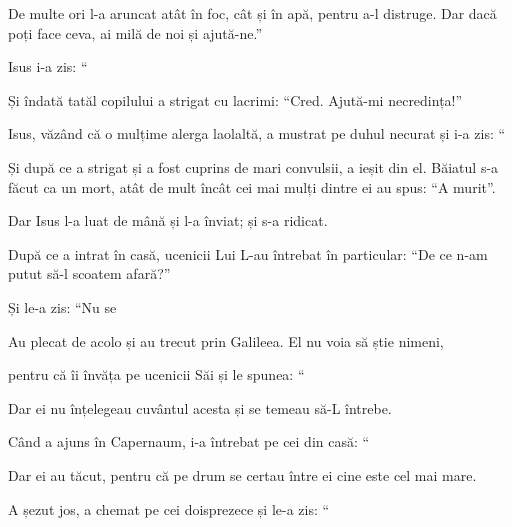 {De multe ori l-a aruncat atât în foc, cât și în apă, pentru a-l distruge. Dar dacă poți face ceva, ai milă de noi și ajută-ne.”


\par }{\PP {}Isus i-a zis: “{}


\par }{\PP {}Și îndată tatăl copilului a strigat cu lacrimi: “Cred. Ajută-mi necredința!”


\par }{\PP {}Isus, văzând că o mulțime alerga laolaltă, a mustrat pe duhul necurat și i-a zis: “{}


\par }{\PP {}Și după ce a strigat și a fost cuprins de mari convulsii, a ieșit din el. Băiatul s-a făcut ca un mort, atât de mult încât cei mai mulți dintre ei au spus: “A murit”.

Dar Isus l-a luat de mână și l-a înviat; și s-a ridicat.


\par }{\PP {}După ce a intrat în casă, ucenicii Lui L-au întrebat în particular: “De ce n-am putut să-l scoatem afară?”


\par }{\PP {}Și le-a zis: “Nu se
{}


\par }{\PP {}Au plecat de acolo și au trecut prin Galileea. El nu voia să știe nimeni,

pentru că îi învăța pe ucenicii Săi și le spunea: “{}


\par }{\PP {}Dar ei nu înțelegeau cuvântul acesta și se temeau să-L întrebe.


\par }{\PP {}Când a ajuns în Capernaum, i-a întrebat pe cei din casă: “{}


\par }{\PP {}Dar ei au tăcut, pentru că pe drum se certau între ei cine este cel mai mare.


\par }{\PP {}A șezut jos, a chemat pe cei doisprezece și le-a zis: “{}

}
